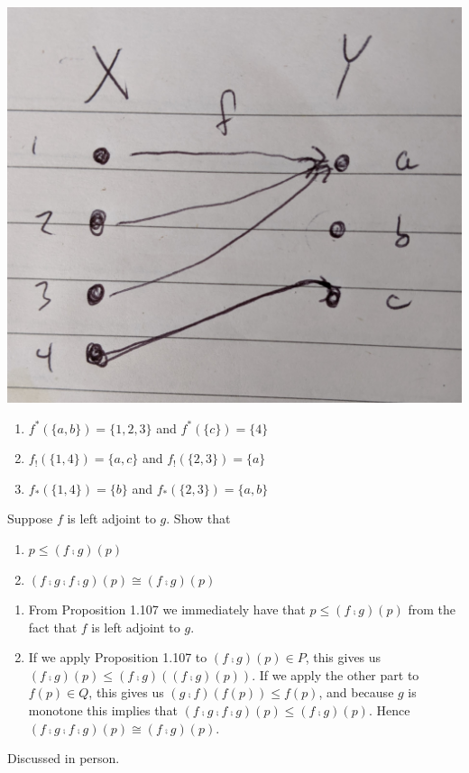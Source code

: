 \solution
\includegraphics[width=0.5\linewidth]{images/1-118.jpg}
\begin{enumerate}
	\item $f^*(\{a,b\}) = \{1,2,3\}$ and $f^*(\{c\})=\{4\}$
	\item $f_!(\{1,4\}) = \{a,c\}$ and $f_!(\{2,3\})=\{a\}$
	\item $f_*(\{1,4\}) = \{b\}$ and $f_*(\{2,3\})=\{a, b\}$
\end{enumerate}

Suppose $f$ is left adjoint to $g$.  Show that
\begin{enumerate}
	\item $p\leq (f\fcmp g)(p)$
	\item $(f \fcmp g\fcmp f \fcmp g)(p)\cong (f\fcmp g)(p)$
\end{enumerate}

\solution
\begin{enumerate}
	\item From Proposition 1.107 we immediately have that $p\leq (f\fcmp g)(p)$ from the fact that $f$ is left adjoint to $g$.
	\item If we apply Proposition 1.107 to $(f\fcmp g)(p)\in P$, this gives us $(f\fcmp g)(p)\leq (f\fcmp g)((f\fcmp g)(p))$.  If we apply the other part to $f(p)\in Q$, this gives us $(g\fcmp f)(f(p))\leq f(p)$, and because $g$ is monotone this implies that $(f\fcmp g\fcmp f\fcmp g)(p) \leq (f\fcmp g)(p)$.  Hence $(f \fcmp g\fcmp f \fcmp g)(p)\cong (f\fcmp g)(p)$.
\end{enumerate}

Discussed in person.
